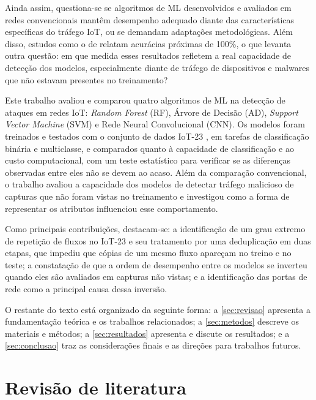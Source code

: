 \documentclass[alpha-refs,brazilian]{CC-EC_TF-TC}
\begin{document}
Ainda assim, questiona-se se algoritmos de ML desenvolvidos e avaliados em redes convencionais mantêm desempenho adequado diante das características específicas do tráfego IoT, ou se demandam adaptações metodológicas. Além disso, estudos como o de \citet{souza2024avaliacao} relatam acurácias próximas de 100\%, o que levanta outra questão: em que medida esses resultados refletem a real capacidade de detecção dos modelos, especialmente diante de tráfego de dispositivos e malwares que não estavam presentes no treinamento?

Este trabalho avaliou e comparou quatro algoritmos de ML na detecção de ataques em redes IoT: \textit{Random Forest} (RF), Árvore de Decisão (AD), \textit{Support Vector Machine} (SVM) e Rede Neural Convolucional (CNN). Os modelos foram treinados e testados com o conjunto de dados IoT-23 \citep{garcia2020iot23}, em tarefas de classificação binária e multiclasse, e comparados quanto à capacidade de classificação e ao custo computacional, com um teste estatístico para verificar se as diferenças observadas entre eles não se devem ao acaso. Além da comparação convencional, o trabalho avaliou a capacidade dos modelos de detectar tráfego malicioso de capturas que não foram vistas no treinamento e investigou como a forma de representar os atributos influenciou esse comportamento.

Como principais contribuições, destacam-se: a identificação de um grau extremo de repetição de fluxos no IoT-23 e seu tratamento por uma deduplicação em duas etapas, que impediu que cópias de um mesmo fluxo apareçam no treino e no teste; a constatação de que a ordem de desempenho entre os modelos se inverteu quando eles são avaliados em capturas não vistas; e a identificação das portas de rede como a principal causa dessa inversão.

O restante do texto está organizado da seguinte forma: a \autoref{sec:revisao} apresenta a fundamentação teórica e os trabalhos relacionados; a \autoref{sec:metodos} descreve os materiais e métodos; a \autoref{sec:resultados} apresenta e discute os resultados; e a \autoref{sec:conclusao} traz as considerações finais e as direções para trabalhos futuros.


\section{Revisão de literatura}
\label{sec:revisao}
\end{document}
